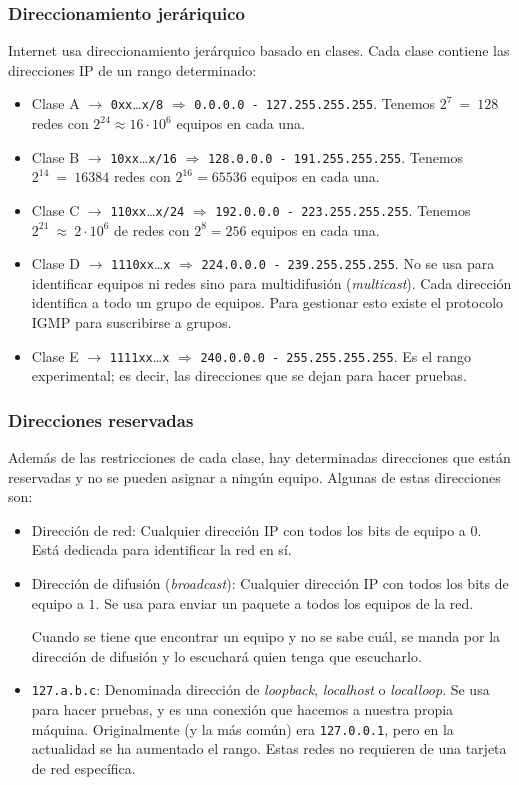 \subsubsection{Direccionamiento jeráriquico}
\noindent
Internet usa direccionamiento jerárquico basado en clases. Cada clase contiene las direcciones IP de un rango determinado:
\begin{itemize}
    \item Clase A $\rightarrow$ \verb|0xx|\ldots\verb|x/8| $\Longrightarrow $ \verb|0.0.0.0 - 127.255.255.255|. Tenemos $2^7~=~128$ redes con $2^{24} \approx 16\cdot 10^6$ equipos en cada una. 
    \item Clase B $\rightarrow$ \verb|10xx|\ldots\verb|x/16| $\Longrightarrow $ \verb|128.0.0.0 - 191.255.255.255|. Tenemos $2^{14}~=~16384$ redes con $2^{16}=65536$ equipos en cada una. 
    \item Clase C $\rightarrow$ \verb|110xx|\ldots\verb|x/24| $\Longrightarrow $ \verb|192.0.0.0 - 223.255.255.255|. Tenemos $2^{21}~\approx~2\cdot 10^6$ de redes con $2^{8} = 256$ equipos en cada una. 
    \item Clase D $\rightarrow$ \verb|1110xx|\ldots\verb|x| $\Longrightarrow$ \verb|224.0.0.0 - 239.255.255.255|. No se usa para identificar equipos ni redes sino para multidifusión (\textit{multicast}). Cada dirección identifica a todo un grupo de equipos. Para gestionar esto existe el protocolo \acrshort{IGMP} para suscribirse a grupos.
    \item Clase E $\rightarrow$ \verb|1111xx|\ldots\verb|x| $\Longrightarrow $ \verb|240.0.0.0 - 255.255.255.255|. Es el rango experimental; es decir, las direcciones que se dejan para hacer pruebas. 
\end{itemize}

\subsubsection{Direcciones reservadas}
Además de las restricciones de cada clase, hay determinadas direcciones que están reservadas y no se pueden asignar a ningún equipo. Algunas de estas direcciones son:
\begin{itemize}
    \item Dirección de red: Cualquier dirección IP con todos los bits de equipo a $0$. Está dedicada para identificar la red en sí.
    \item Dirección de difusión (\textit{broadcast}): Cualquier dirección IP con todos los bits de equipo a $1$. Se usa para enviar un paquete a todos los equipos de la red.
    
    Cuando se tiene que encontrar un equipo y no se sabe cuál, se manda por la dirección de difusión y lo escuchará quien tenga que escucharlo.

    \item \verb|127.a.b.c|: Denominada dirección de \textit{loopback}, \textit{localhost} o \textit{localloop}. Se usa para hacer pruebas, y es una conexión que hacemos a nuestra propia máquina. Originalmente (y la más común) era \verb|127.0.0.1|, pero en la actualidad se ha aumentado el rango.
    Estas redes no requieren de una tarjeta de red específica.
\end{itemize}

